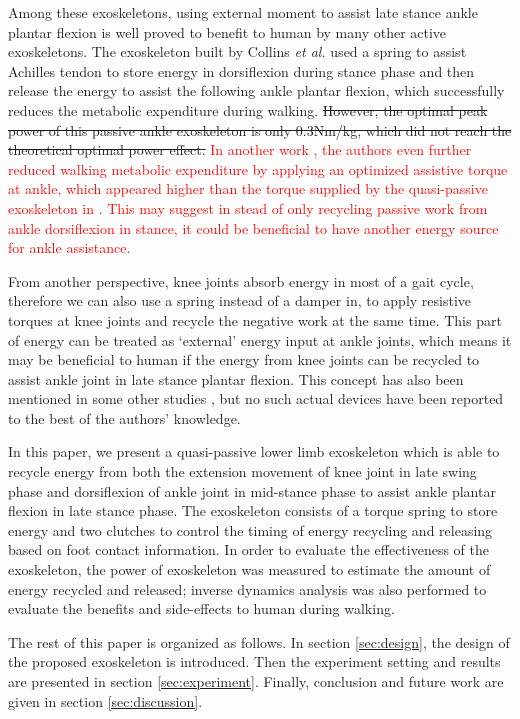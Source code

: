 \documentclass[twocolumn,cleanfoot,10pt]{asme2ej}
\begin{document}
Among these exoskeletons, using external moment to assist late stance ankle plantar flexion is well proved to benefit to human by many other active exoskeletons\cite{RN5,RN9,RN10,RN11,RN12}.
The exoskeleton built by Collins \emph{et al.}\cite{RN5} used a spring to assist Achilles tendon to store energy in dorsiflexion during stance phase and then release the energy to assist the following ankle plantar flexion, which successfully reduces the metabolic expenditure during walking.
\sout{However, the optimal peak power of this passive ankle exoskeleton \cite{RN5} is only 0.3Nm/kg, which did not reach the theoretical optimal power effect\cite{zhang2017human}.}
\textcolor{red}{In another work \cite{zhang2017human}, the authors even further reduced walking metabolic expenditure by applying an optimized assistive torque at ankle, which appeared higher than the torque supplied by the quasi-passive exoskeleton in \cite{RN5}.
This may suggest in stead of only recycling passive work from ankle dorsiflexion in stance, it could be beneficial to have another energy source for ankle assistance.}

From another perspective, knee joints absorb energy in most of a gait cycle\cite{RN2}, therefore we can also use a spring instead of a damper in\cite{RN3}, to apply resistive torques at knee joints and recycle the negative work at the same time.
This part of energy can be treated as ‘external’ energy input at ankle joints, which means it may be beneficial to human if the energy from knee joints can be recycled to assist ankle joint in late stance plantar flexion.
This concept has also been mentioned in some other studies\cite{RN3} \cite{RN12}, but no such actual devices have been reported to the best of the authors' knowledge.

In this paper, we present a quasi-passive lower limb exoskeleton which is able to recycle energy from both the extension movement of knee joint in late swing phase and dorsiflexion of ankle joint in mid-stance phase to assist ankle plantar flexion in late stance phase.
The exoskeleton consists of a torque spring to store energy and two clutches to control the timing of energy recycling and releasing based on foot contact information.
In order to evaluate the effectiveness of the exoskeleton, the power of exoskeleton was measured to estimate the amount of energy recycled and released; inverse dynamics analysis was also performed to evaluate the benefits and side-effects to human during walking.

The rest of this paper is organized as follows.
In section \ref{sec:design}, the design of the proposed exoskeleton is introduced.
Then the experiment setting and results are presented in section \ref{sec:experiment}.
Finally, conclusion and future work are given in section \ref{sec:discussion}.
\end{document}
